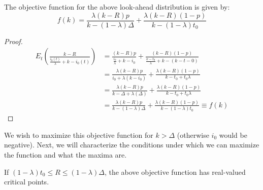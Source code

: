 \begin{lemma}
The objective function for the above look-ahead distribution is given by:
\begin{equation*}
f(k) = \frac{\lambda (k-R)p}{k-(1-\lambda)\Delta}+\frac{\lambda (k-R)(1-p)}{k-(1-\lambda)t_0}
\end{equation*}
\end{lemma}

\begin{proof}
\begin{align*}
E_t\left(\frac{k-R}{\frac{i_0(t)}{\lambda}+k-i_0(t)} \right) &= \frac{(k-R)p}{\frac{i_0}{\lambda}+k-i_0}+\frac{(k-R)(1-p)}{\frac{k-t_0}{\lambda}+k-(k-t-0)} \\
&= \frac{\lambda(k-R)p}{i_0+\lambda(k-i_0)}+\frac{\lambda(k-R)(1-p)}{k-t_0+t_0\lambda} \\
&= \frac{\lambda(k-R)p}{k-\Delta+\lambda(\Delta)}+\frac{\lambda(k-R)(1-p)}{k-t_0+t_0\lambda} \\
&= \frac{\lambda (k-R)p}{k-(1-\lambda)\Delta}+\frac{\lambda (k-R)(1-p)}{k-(1-\lambda)t_0} \equiv f(k)
\end{align*}
\end{proof}

We wish to maximize this objective function for $k>\Delta$ (otherwise $i_0$ would be negative). Next, we will characterize the conditions under which we can maximize the function and what the maxima are.

\begin{lemma}
If $(1-\lambda)t_0 \leq R \leq (1-\lambda)\Delta$, the above objective function has real-valued critical points.
\end{lemma}

